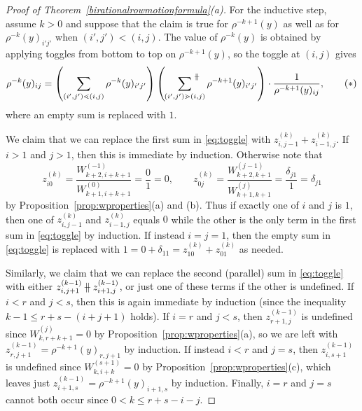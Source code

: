 \documentclass[11pt]{article}
\theoremstyle{definition}
\numberwithin{equation}{section}
\numberwithin{equation}{section}
\newcommand{\parallelsum}{\:\ \mathclap{\|}\mathclap{-}\ \:}
\begin{document}
\begin{proof}[Proof of Theorem~\ref{birationalrowmotionformula}(a)]
For the inductive step, assume $k > 0$ and suppose that the claim is true for $\rho^{-k+1}(y)$ as well as for $\rho^{-k}(y)_{i'j'}$ when $(i',j') < (i,j)$. The value of $\rho^{-k}(y)$ is obtained by applying toggles from bottom to top on $\rho^{-k+1}(y)$, so the toggle at $(i,j)$ gives
\[\rho^{-k}(y)_{ij} = \left(\sum_{(i',j')\lessdot (i,j)} \rho^{-k}(y)_{i'j'}\right)\left(\;\;\;\sideset{}{^{\parallelsum}}\sum_{(i',j') \gtrdot (i,j)}\rho^{-k+1}(y)_{i'j'}\right) \cdot \frac{1}{\rho^{-k+1}(y)_{ij}}, \tag{$*$} \label{eq:toggle}\]
where an empty sum is replaced with $1$. 

We claim that we can replace the first sum in \eqref{eq:toggle} with $z_{i,j-1}^{(k)}+z_{i-1,j}^{(k)}$. If $i > 1$ and $j > 1$, then this is immediate by induction. Otherwise note that
\[
    z_{i0}^{(k)} = \frac{W_{k+2,i+k+1}^{(-1)}}{W_{k+1,i+k+1}^{(0)}} = \frac01= 0,\qquad
    z_{0j}^{(k)} = \frac{W_{k+2,k+1}^{(j-1)}}{W_{k+1,k+1}^{(j)}} = \frac{\delta_{j1}}{1} = \delta_{j1}
\]
by Proposition~\ref{prop:wproperties}(a) and (b).
Thus if exactly one of $i$ and $j$ is $1$, then one of $z_{i,j-1}^{(k)}$ and $z_{i-1,j}^{(k)}$ equals $0$ while the other is the only term in the first sum in \eqref{eq:toggle} by induction. If instead $i=j=1$, then the empty sum in \eqref{eq:toggle} is replaced with $1=0 + \delta_{11} = z_{10}^{(k)} + z_{01}^{(k)}$ as needed.

Similarly, we claim that we can replace the second (parallel) sum in \eqref{eq:toggle} with either $z_{i,j+1}^{(k-1)} \parallelsum z_{i+1,j}^{(k-1)}$, or just one of these terms if the other is undefined. If $i < r$ and $j < s$, then this is again immediate by induction (since the inequality $k-1 \leq r+s-(i+j+1)$ holds). If $i=r$ and $j < s$, then $z_{r+1,j}^{(k-1)}$ is undefined since $W_{k,r+k+1}^{(j)}=0$ by Proposition~\ref{prop:wproperties}(a), so we are left with $z_{r,j+1}^{(k-1)} = \rho^{-k+1}(y)_{r,j+1}$ by induction. If instead $i < r$ and $j=s$, then $z_{i,s+1}^{(k-1)}$ is undefined since $W_{k,i+k}^{(s+1)} = 0$ by Proposition~\ref{prop:wproperties}(c), which leaves just $z_{i+1,s}^{(k-1)} = \rho^{-k+1}(y)_{i+1,s}$ by induction. Finally, $i=r$ and $j=s$ cannot both occur since $0 < k \leq r+s-i-j$.


\end{proof}
\end{document}
